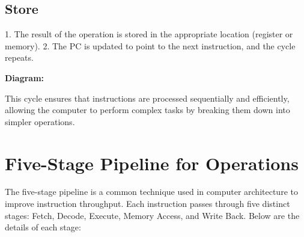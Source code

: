 \documentclass{report}
\begin{document}
\subsection{Store}

1. The result of the operation is stored in the appropriate location (register or memory).
2. The PC is updated to point to the next instruction, and the cycle repeats.

\textbf{Diagram:}

\begin{center}
\end{center}

This cycle ensures that instructions are processed sequentially and efficiently, allowing the computer to perform complex tasks by breaking them down into simpler operations.

\section{Five-Stage Pipeline for Operations}

The five-stage pipeline is a common technique used in computer architecture to improve instruction throughput. Each instruction passes through five distinct stages: Fetch, Decode, Execute, Memory Access, and Write Back. Below are the details of each stage:
\end{document}
